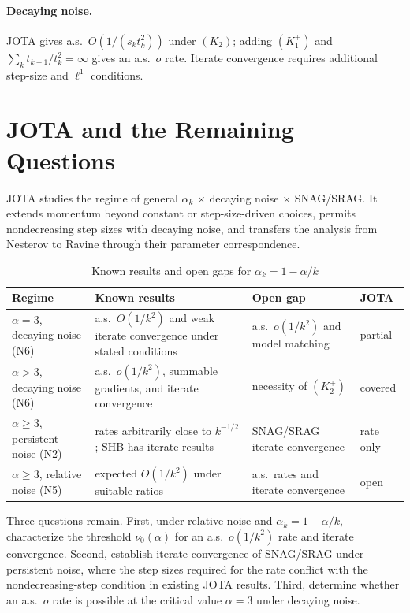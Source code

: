 \documentclass[11pt]{article}
\begin{document}
\paragraph{Decaying noise.} JOTA gives a.s.\ $O(1/(s_kt_k^2))$ under $(K_2)$; adding $(K_1^+)$ and $\sum_k t_{k+1}/t_k^2=\infty$ gives an a.s.\ $o$ rate. Iterate convergence requires additional step-size and $\ell^1$ conditions.

\section{JOTA and the Remaining Questions}

JOTA studies the regime of general $\alpha_k$ $\times$ decaying noise $\times$ SNAG/SRAG. It extends momentum beyond constant or step-size-driven choices, permits nondecreasing step sizes with decaying noise, and transfers the analysis from Nesterov to Ravine through their parameter correspondence.

\begin{table}[htbp]
\centering
\small
\caption{Known results and open gaps for $\alpha_k=1-\alpha/k$}
\label{tab:gaps}
\begin{tabularx}{\textwidth}{@{}p{2.2cm}YYp{1.6cm}@{}}
\toprule
Regime & Known results & Open gap & JOTA \\
\midrule
$\alpha=3$, decaying noise (N6) & a.s.\ $O(1/k^2)$ and weak iterate convergence under stated conditions \citep{attouch2026ravine,salzo2025iterates} & a.s.\ $o(1/k^2)$ and model matching & partial \\
$\alpha>3$, decaying noise (N6) & a.s.\ $o(1/k^2)$, summable gradients, and iterate convergence \citep{attouch2026ravine} & necessity of $(K_2^+)$ & covered \\
$\alpha\ge3$, persistent noise (N2) & rates arbitrarily close to $k^{-1/2}$; SHB has iterate results \citep{attouch2026ravine,sebbouh2021,liu2022} & SNAG/SRAG iterate convergence & rate only \\
$\alpha\ge3$, relative noise (N5) & expected $O(1/k^2)$ under suitable ratios \citep{vaswani2019fast,gupta2024nesterov} & a.s.\ rates and iterate convergence & open \\
\bottomrule
\end{tabularx}
\end{table}

Three questions remain. First, under relative noise and $\alpha_k=1-\alpha/k$, characterize the threshold $\nu_0(\alpha)$ for an a.s.\ $o(1/k^2)$ rate and iterate convergence. Second, establish iterate convergence of SNAG/SRAG under persistent noise, where the step sizes required for the rate conflict with the nondecreasing-step condition in existing JOTA results. Third, determine whether an a.s.\ $o$ rate is possible at the critical value $\alpha=3$ under decaying noise.
\end{document}
